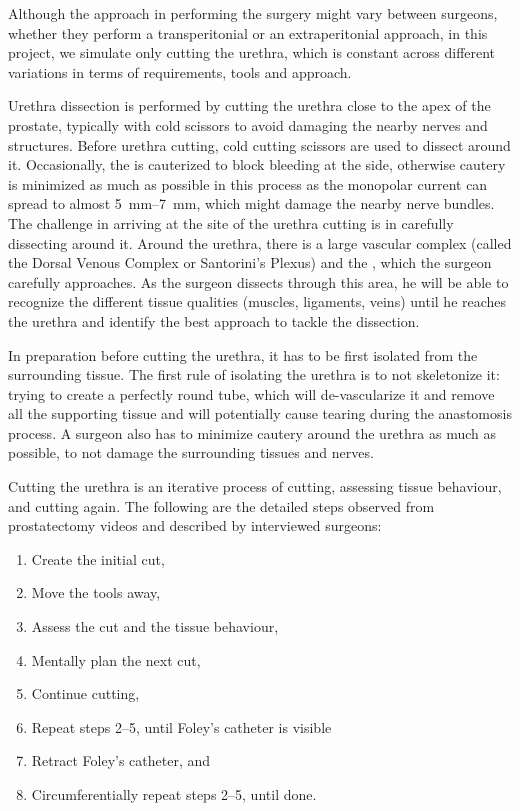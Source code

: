 Although the approach in performing the surgery might vary between surgeons, \eg whether they perform a transperitonial or an extraperitonial approach, in this project, we simulate only cutting the urethra, which is constant across different variations in terms of requirements, tools and approach.

Urethra dissection is performed by cutting the urethra close to the apex of the prostate, typically with cold scissors to avoid damaging the nearby nerves and structures. Before urethra cutting, cold cutting scissors are used to dissect around it. Occasionally, the  is cauterized to block bleeding at the side, otherwise cautery is minimized as much as possible in this process as the monopolar current can spread to almost \SIrange{5}{7}{\milli\metre}, which might damage the nearby nerve bundles. The challenge in arriving at the site of the urethra cutting is in carefully dissecting around it. Around the urethra, there is a large vascular complex (called the Dorsal Venous Complex or Santorini's Plexus) and the , which the surgeon carefully approaches. As the surgeon dissects through this area, he will be able to recognize the different tissue qualities (muscles, ligaments, veins) until he reaches the urethra and identify the best approach to tackle the dissection.

In preparation before cutting the urethra, it has to be first isolated from the surrounding tissue. The first rule of isolating the urethra is to not skeletonize it: trying to create a perfectly round tube, which will de-vascularize it and remove all the supporting tissue and will potentially cause tearing during the anastomosis process. A surgeon also has to minimize cautery around the urethra as much as possible, to not damage the surrounding tissues and nerves.

Cutting the urethra is an iterative process of cutting, assessing tissue behaviour, and cutting again. The following are the detailed steps observed from prostatectomy videos and described by interviewed surgeons:
\begin{enumerate}[1.]
  \item Create the initial cut,
  \item Move the tools away,
  \item Assess the cut and the tissue behaviour,
  \item Mentally plan the next cut,
  \item Continue cutting,
  \item Repeat steps 2--5, until Foley's catheter is visible
  \item Retract Foley's catheter, and
  \item Circumferentially repeat steps 2--5, until done.
\end{enumerate}

